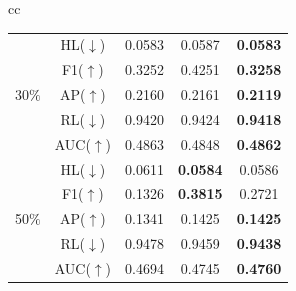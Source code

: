 \documentclass[12pt,a4paper,oneside,english]{report}
\begin{document}
\begin{table}[htbp]
\begin{tabular}{cc}
\begin{minipage}{0.5\textwidth}
\begin{tabular}{|c|c|c|c|c|}
                & HL(\(\downarrow\)) & 0.0583 & 0.0587 & \textbf{0.0583} \\
                & F1(\(\uparrow\)) & 0.3252 & 0.4251 & \textbf{0.3258} \\
                30\(\%\) & AP(\(\uparrow\)) & 0.2160 & 0.2161 & \textbf{0.2119} \\
                & RL(\(\downarrow\)) & 0.9420 & 0.9424 & \textbf{0.9418} \\
                & AUC(\(\uparrow\)) & 0.4863 & 0.4848 & \textbf{0.4862} \\
                \hline
                
                & HL(\(\downarrow\)) & 0.0611 & \textbf{0.0584} & 0.0586 \\
                & F1(\(\uparrow\)) & 0.1326 & \textbf{0.3815} & 0.2721 \\
                50\(\%\) & AP(\(\uparrow\)) & 0.1341 & 0.1425 & \textbf{0.1425} \\
                & RL(\(\downarrow\)) & 0.9478 & 0.9459 & \textbf{0.9438} \\
                & AUC(\(\uparrow\)) & 0.4694 & 0.4745 & \textbf{0.4760} \\
                \hline
            \end{tabular}
        \end{minipage}
    \end{tabular}
    \label{table:side_by_side}
\end{table}
\end{document}
